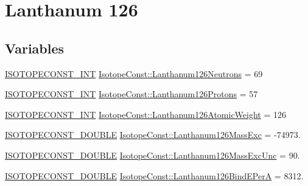 \hypertarget{group___isotope_const-_lanthanum-_la126}{}\section{Lanthanum 126}
\label{group___isotope_const-_lanthanum-_la126}
\subsection*{Variables}
\begin{DoxyCompactItemize}
\item 
\mbox{\hyperlink{group___isotope_const-_macros_ga5f18360b3e99483a35c32d789e62621c}{I\+S\+O\+T\+O\+P\+E\+C\+O\+N\+S\+T\+\_\+\+I\+NT}} \mbox{\hyperlink{group___isotope_const-_lanthanum-_la126_ga777de506f47966422867b2f05b01d529}{Isotope\+Const\+::\+Lanthanum126\+Neutrons}} = 69
\item 
\mbox{\hyperlink{group___isotope_const-_macros_ga5f18360b3e99483a35c32d789e62621c}{I\+S\+O\+T\+O\+P\+E\+C\+O\+N\+S\+T\+\_\+\+I\+NT}} \mbox{\hyperlink{group___isotope_const-_lanthanum-_la126_gae426f1951cf98ed40156afc822a5f88a}{Isotope\+Const\+::\+Lanthanum126\+Protons}} = 57
\item 
\mbox{\hyperlink{group___isotope_const-_macros_ga5f18360b3e99483a35c32d789e62621c}{I\+S\+O\+T\+O\+P\+E\+C\+O\+N\+S\+T\+\_\+\+I\+NT}} \mbox{\hyperlink{group___isotope_const-_lanthanum-_la126_gad8aa7611e693e342b78f53cb491adf88}{Isotope\+Const\+::\+Lanthanum126\+Atomic\+Weight}} = 126
\item 
\mbox{\hyperlink{group___isotope_const-_macros_ga8f45a7272ce02c0b4c65c44636ed719a}{I\+S\+O\+T\+O\+P\+E\+C\+O\+N\+S\+T\+\_\+\+D\+O\+U\+B\+LE}} \mbox{\hyperlink{group___isotope_const-_lanthanum-_la126_ga53b38a39df8740221c1cbbd3bafff43e}{Isotope\+Const\+::\+Lanthanum126\+Mass\+Exc}} = -\/74973.
\item 
\mbox{\hyperlink{group___isotope_const-_macros_ga8f45a7272ce02c0b4c65c44636ed719a}{I\+S\+O\+T\+O\+P\+E\+C\+O\+N\+S\+T\+\_\+\+D\+O\+U\+B\+LE}} \mbox{\hyperlink{group___isotope_const-_lanthanum-_la126_gab17eedb342021f1be34240761c4ff713}{Isotope\+Const\+::\+Lanthanum126\+Mass\+Exc\+Unc}} = 90.
\item 
\mbox{\hyperlink{group___isotope_const-_macros_ga8f45a7272ce02c0b4c65c44636ed719a}{I\+S\+O\+T\+O\+P\+E\+C\+O\+N\+S\+T\+\_\+\+D\+O\+U\+B\+LE}} \mbox{\hyperlink{group___isotope_const-_lanthanum-_la126_ga423ba4c3d909be20e81f478ebb4f0ecc}{Isotope\+Const\+::\+Lanthanum126\+Bind\+E\+PerA}} = 8312.
\item 

\end{DoxyCompactItemize}
